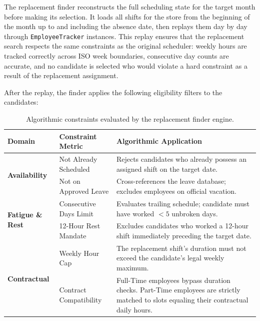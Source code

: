 \par The replacement finder reconstructs the full scheduling state for the target month before making its selection. It loads all shifts for the store from the beginning of the month up to and including the absence date, then replays them day by day through \texttt{EmployeeTracker} instances. This replay ensures that the replacement search respects the same constraints as the original scheduler: weekly hours are tracked correctly across ISO week boundaries, consecutive day counts are accurate, and no candidate is selected who would violate a hard constraint as a result of the replacement assignment.

\par After the replay, the finder applies the following eligibility filters to the candidates:

\vspace{1.5em}
\begin{table}[h!]
    \centering
    \caption{Algorithmic constraints evaluated by the replacement finder engine.}
    \renewcommand{\arraystretch}{1.5}
    \begin{tabular}{|l|p{4.5cm}|p{6cm}|}
        \hline
        \textbf{Domain} & \textbf{Constraint Metric} & \textbf{Algorithmic Application} \\ \hline
        \multirow{2}{*}{\textbf{Availability}} & Not Already Scheduled & Rejects candidates who already possess an assigned shift on the target date. \\ \cline{2-3}
        & Not on Approved Leave & Cross-references the leave database; excludes employees on official vacation. \\ \hline
        \multirow{2}{*}{\textbf{Fatigue \& Rest}} & Consecutive Days Limit & Evaluates trailing schedule; candidate must have worked $< 5$ unbroken days. \\ \cline{2-3}
        & 12-Hour Rest Mandate & Excludes candidates who worked a 12-hour shift immediately preceding the target date. \\ \hline
        \multirow{2}{*}{\textbf{Contractual}} & Weekly Hour Cap & The replacement shift's duration must not exceed the candidate's legal weekly maximum. \\ \cline{2-3}
        & Contract Compatibility & Full-Time employees bypass duration checks. Part-Time employees are strictly matched to slots equaling their contractual daily hours. \\ \hline
    \end{tabular}
    \label{tab:replacement_constraints}
\end{table}
\vspace{1.5em}

